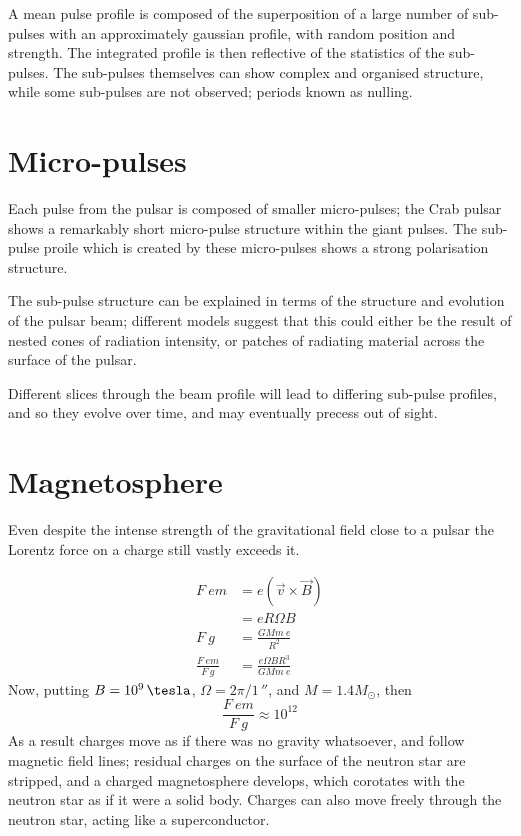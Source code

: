 A mean pulse profile is composed of the superposition of a large
number of sub-pulses with an approximately gaussian profile, with
random position and strength. The integrated profile is then
reflective of the statistics of the sub-pulses. The sub-pulses
themselves can show complex and organised structure, while some
sub-pulses are not observed; periods known as nulling.

\section{Micro-pulses}
\label{sec:micro-pulses}

Each pulse from the pulsar is composed of smaller micro-pulses; the
Crab pulsar shows a remarkably short micro-pulse structure within the
giant pulses. The sub-pulse proile which is created by these
micro-pulses shows a strong polarisation structure.

The sub-pulse structure can be explained in terms of the structure and
evolution of the pulsar beam; different models suggest that this could
either be the result of nested cones of radiation intensity, or
patches of radiating material across the surface of the pulsar.

Different slices through the beam profile will lead to differing
sub-pulse profiles, and so they evolve over time, and may eventually
precess out of sight.

\section{Magnetosphere}
\label{sec:magnetosphere}

Even despite the intense strength of the gravitational field close to
a pulsar the Lorentz force on a charge still vastly exceeds it.

\begin{align*}
  F~{em} &= e(\vec{v} \times \vec{B}) \\ &= e R \Omega B \\
F~g &= \frac{GMm~e}{R^2} \\
\frac{F~{em}}{F~g} &= \frac{e \Omega B R^3}{G M m~e}
\end{align*}
Now, putting $B=10^9\,\tesla$, $\Omega = 2\pi / 1\,\second$, and $M = 1.4M_{\odot}$, then
\begin{equation}
  \label{eq:112}
  \frac{F~{em}}{F~g} \approx 10^{12}
\end{equation}
As a result charges move as if there was no gravity whatsoever, and
follow magnetic field lines; residual charges on the surface of the
neutron star are stripped, and a charged magnetosphere develops, which
corotates with the neutron star as if it were a solid body. Charges
can also move freely through the neutron star, acting like a
superconductor.

